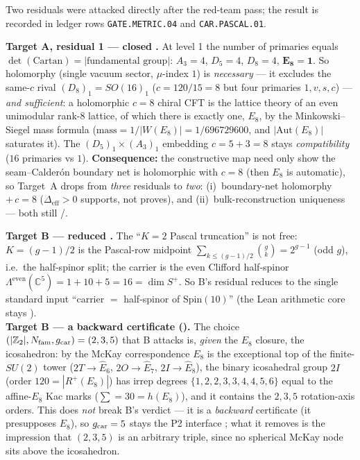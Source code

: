 \begin{winbox}
Two residuals were attacked directly after the red-team pass; the result is recorded in ledger rows
\texttt{GATE.METRIC.04} and \texttt{CAR.PASCAL.01}.

\smallskip\noindent\textbf{Target A, residual 1 --- closed \mE.} At level 1 the number of primaries equals
$\det(\text{Cartan})=|\text{fundamental group}|$: $A_3{=}4$, $D_5{=}4$, $D_8{=}4$, $\mathbf{E_8{=}1}$. So holomorphy
(single vacuum sector, $\mu$-index $1$) is \emph{necessary} --- it excludes the same-$c$ rival $(D_8)_1=SO(16)_1$
($c=120/15=8$ but four primaries $1,v,s,c$) --- \emph{and sufficient}: a holomorphic $c=8$ chiral CFT is the lattice
theory of an even unimodular rank-$8$ lattice, of which there is exactly one, $E_8$, by the Minkowski--Siegel mass
formula ($\text{mass}=1/|W(E_8)|=1/696729600$, and $|\mathrm{Aut}(E_8)|$ saturates it). The
$(D_5)_1\times(A_3)_1$ embedding $c=5+3=8$ stays \emph{compatibility} ($16$ primaries vs $1$). \textbf{Consequence:}
the constructive map need only show the seam--Calder\'on boundary net is holomorphic with $c=8$ (then $E_8$ is
automatic), so Target~A drops from \emph{three} residuals to \emph{two}: (i)~boundary-net holomorphy $+\,c=8$
($\Delta_{\mathrm{eff}}>0$ supports, not proves), and (ii)~bulk-reconstruction uniqueness --- both still \mC/\mO.

\smallskip\noindent\textbf{Target B --- reduced \mE.} The ``$K=2$ Pascal truncation'' is not free:
$K=(g-1)/2$ is the Pascal-row midpoint $\sum_{k\le(g-1)/2}\binom{g}{k}=2^{g-1}$ (odd $g$), i.e.\ the half-spinor
split; the carrier is the even Clifford half-spinor $\Lambda^{\mathrm{even}}(\mathbb C^{5})=1+10+5=16=\dim S^+$. So
B's residual reduces to the single standard input ``carrier $=$ half-spinor of $\mathrm{Spin}(10)$'' (the Lean
arithmetic core stays \mE).
\smallskip\\
\noindent\textbf{Target B --- a backward certificate ().} The choice
$(|\mathbb{Z}_2|,N_{\mathrm{fam}},g_{\mathrm{car}})=(2,3,5)$ that B attacks is, \emph{given} the $E_8$ closure, the icosahedron: by the
McKay correspondence $E_8$ is the exceptional top of the finite-$SU(2)$ tower ($2T{\to}\hat E_6$,
$2O{\to}\hat E_7$, $2I{\to}\hat E_8$), the binary icosahedral group $2I$ (order $120=|R^+(E_8)|$) has irrep
degrees $\{1,2,2,3,3,4,4,5,6\}$ equal to the affine-$E_8$ Kac marks ($\sum=30=h(E_8)$), and it contains the
$2,3,5$ rotation-axis orders. This does \emph{not} break B's verdict --- it is a \emph{backward} certificate
(it presupposes $E_8$), so $g_{\mathrm{car}}=5$ stays the P2 interface \mO; what it removes is the impression that
$(2,3,5)$ is an arbitrary triple, since no spherical McKay node sits above the icosahedron.


\end{winbox}
